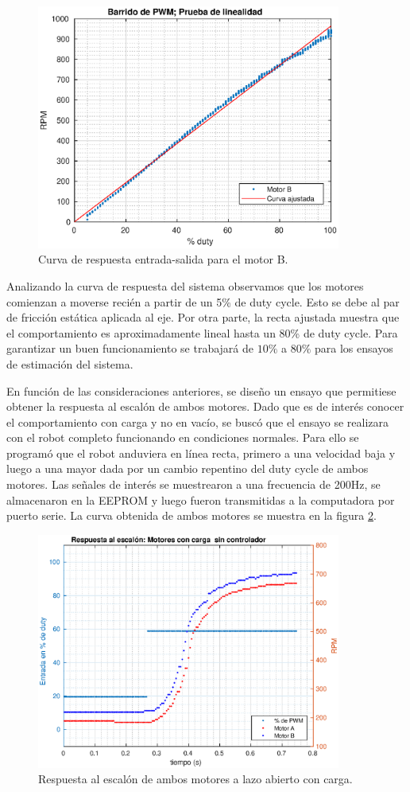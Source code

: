 \documentclass[10pt,conference,a4paper,onecolumn]{article}%
\begin{document}
\begin{figure}[h]
\centering
\includegraphics[width=10cm]{./imagenes/prueba_linealidad.eps}
\caption{Curva de respuesta entrada-salida para el motor B.}
\label{linealidad}
\end{figure}

Analizando la curva de respuesta del sistema observamos que los motores comienzan a moverse recién a partir de un 5\% de duty cycle. Esto se debe al par de fricción estática aplicada al eje. Por otra parte, la recta ajustada muestra que el comportamiento es aproximadamente lineal hasta un 80\% de duty cycle. Para garantizar un buen funcionamiento se trabajará de $10\%$ a $80\%$ para los ensayos de estimación del sistema.

En función de las consideraciones anteriores, se diseño un ensayo que permitiese obtener la respuesta al escalón de ambos motores. Dado que es de interés conocer el comportamiento con carga y no en vacío, se buscó que el ensayo se realizara con el robot completo funcionando en condiciones normales. Para ello se programó que el robot anduviera en línea recta, primero a una velocidad baja y luego a una mayor dada por un cambio repentino del duty cycle de ambos motores. Las señales de interés se muestrearon a una frecuencia de 200Hz, se almacenaron en la EEPROM y luego fueron transmitidas a la computadora por puerto serie. La curva obtenida de ambos motores se muestra en la figura \ref{EscalonMotores}.
\begin{figure}[h]
\centering
\includegraphics[width=10cm]{./imagenes/resp_escalon_motores_2}
\caption{Respuesta al escalón de ambos motores a lazo abierto con carga.}
\label{EscalonMotores}
\end{figure}
\end{document}
